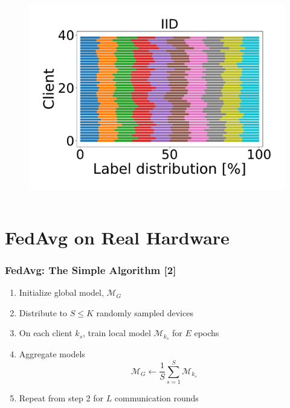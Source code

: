 \documentclass{beamer}
\begin{document}
\begin{frame}
\begin{columns}
\begin{column}{.55\textwidth}
\begin{figure}[htb!]
				\includegraphics[width=0.49\linewidth]{imgs/splits(IID)}
			\end{figure}
		\end{column}
	\end{columns}

\end{frame}

\section{FedAvg on Real Hardware}
\begin{frame}
    \frametitle{FedAvg: The Simple Algorithm [2]}
    \begin{enumerate}
        \item Initialize global model, $\mathcal M_G$
        \item Distribute to $S \le K$ randomly sampled devices
        \item On each client $k_s$, train local model $\mathcal M_{k_s}$ for $E$ epochs
        \item Aggregate models
    \begin{equation*}
        \mathcal M_G \gets \frac{1}{S} \sum_{s=1}^{S} \mathcal M_{k_s}
    \end{equation*}
        \item Repeat from step 2 for $L$ communication rounds
    \end{enumerate}
\end{frame}
\end{document}
